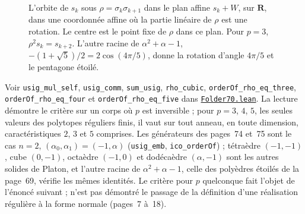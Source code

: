 \begin{figure}[htbp]
\centering
{}
\caption{L'orbite de $s_k$ sous $\rho = \sigma_k\sigma_{k+1}$ dans le plan affine $s_k + W$, sur $\mathbf R$, dans une coordonnée affine où la partie linéaire de $\rho$ est une rotation. Le centre est le point fixe de $\rho$ dans ce plan. Pour $p = 3$, $\rho^2 s_k = s_{k+2}$. L'autre racine de $\alpha^2 + \alpha - 1$, $-(1 + \sqrt 5)/2 = 2\cos(4\pi/5)$, donne la rotation d'angle $4\pi/5$ et le pentagone étoilé.}
\label{fig:70-ordres}
\end{figure}

\begin{remarque}
Voir \texttt{usig\_mul\_self}, \texttt{usig\_comm}, \texttt{sum\_usig}, \texttt{rho\_cubic}, \texttt{orderOf\_rho\_eq\_three}, \texttt{orderOf\_rho\_eq\_four} et \texttt{orderOf\_rho\_eq\_five} dans \href{\leanblob/Geometry/Folder70.lean}{\texttt{Folder70.\allowbreak{}lean}}. La lecture démontre le critère sur un corps où $p$ est inversible ; pour $p = 3$, $4$, $5$, les seules valeurs des polytopes réguliers finis, il vaut sur tout anneau, en toute dimension, caractéristiques $2$, $3$ et $5$ comprises. Les générateurs des pages~74 et~75 sont le cas $n = 2$, $(\alpha_0, \alpha_1) = (-1, \alpha)$ (\texttt{usig\_emb}, \texttt{ico\_orderOf}) ; tétraèdre $(-1, -1)$, cube $(0, -1)$, octaèdre $(-1, 0)$ et dodécaèdre $(\alpha, -1)$ sont les autres solides de Platon, et l'autre racine de $\alpha^2 + \alpha - 1$, celle des polyèdres étoilés de la page~69, vérifie les mêmes identités. Le critère pour $p$ quelconque fait l'objet de l'énoncé suivant ; n'est pas démontré le passage de la définition d'une réalisation régulière à la forme normale (pages~7 à~18).
\end{remarque}

